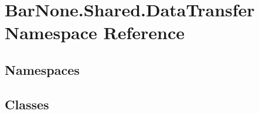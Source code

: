 \hypertarget{namespace_bar_none_1_1_shared_1_1_data_transfer}{}\section{Bar\+None.\+Shared.\+Data\+Transfer Namespace Reference}
\label{namespace_bar_none_1_1_shared_1_1_data_transfer}
\subsection*{Namespaces}
\begin{DoxyCompactItemize}
\end{DoxyCompactItemize}
\subsection*{Classes}
